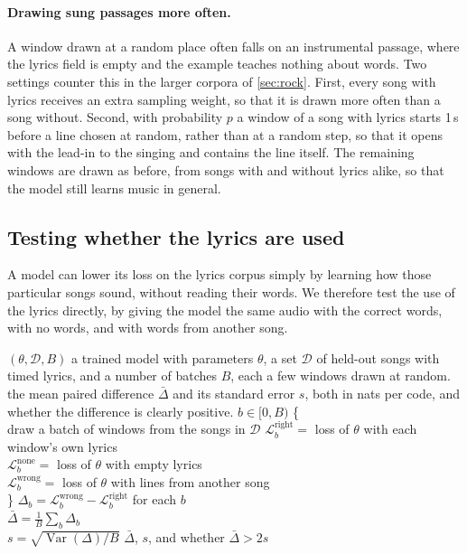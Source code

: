 \paragraph{Drawing sung passages more often.} A window drawn at a random
place often falls on an instrumental passage, where the lyrics field is empty
and the example teaches nothing about words. Two settings counter this in the
larger corpora of \cref{sec:rock}. First, every song with lyrics receives an
extra sampling weight, so that it is drawn more often than a song without.
Second, with probability $p$ a window of a song with lyrics starts 1\,s before
a line chosen at random, rather than at a random step, so that it opens with
the lead-in to the singing and contains the line itself. The remaining windows
are drawn as before, from songs with and without lyrics alike, so that the
model still learns music in general.

\subsection{Testing whether the lyrics are used}
\label{sec:lyrics-test}

A model can lower its loss on the lyrics corpus simply by learning how those
particular songs sound, without reading their words. We therefore test the use
of the lyrics directly, by giving the model the same audio with the correct
words, with no words, and with words from another song.

\begin{procedure}{$(\theta, \mathcal{D}, B)$}
{a trained model with parameters $\theta$, a set $\mathcal{D}$ of held-out songs
with timed lyrics, and a number of batches $B$, each a few windows drawn at
random.}
{the mean paired difference $\bar\Delta$ and its standard error $s$, both in
nats per code, and whether the difference is clearly positive.}
\li {} $b \in [0, B)$ \{ \\
\li \> draw a batch of windows from the songs in $\mathcal{D}$ \groupend
\li \> $\mathcal{L}^\text{right}_b = $ loss of $\theta$ with each window's own lyrics \\
\li \> $\mathcal{L}^\text{none}_b = $ loss of $\theta$ with empty lyrics \\
\li \> $\mathcal{L}^\text{wrong}_b = $ loss of $\theta$ with lines from another song \\
\li \} \groupend
\li $\Delta_b = \mathcal{L}^\text{wrong}_b - \mathcal{L}^\text{right}_b$ for each $b$ \\
\li $\bar\Delta = \frac{1}{B} \sum_b \Delta_b$ \\
\li $s = \sqrt{\operatorname{Var}(\Delta) / B}$ \groupend
\li {} $\bar\Delta$, $s$, and whether $\bar\Delta > 2s$
\end{procedure}


